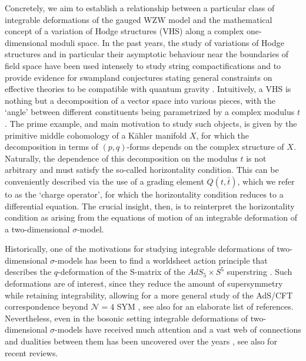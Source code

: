 \documentclass[11pt,a4paper]{article}
\numberwithin{equation}{section}
\numberwithin{table}{section}\setlength{\multlinegap}{25pt}
\begin{document}
Concretely, we aim to establish a relationship between a particular class of integrable deformations of the gauged WZW model and the mathematical concept of a variation of Hodge structures (VHS) along a complex one-dimensional moduli space. In the past years, the study of variations of Hodge structures and in particular their asymptotic behaviour near the boundaries of field space have been used intensely to study string compactifications and to provide evidence for swampland conjectures stating general constraints on effective theories to 
be compatible with quantum gravity \cite{GPV,Grimm:2018cpv,Palti:2019pca,Grimm:2019ixq,Grimm:2019wtx,Font:2019cxq,Gendler:2020dfp,Lanza:2020qmt,Calderon-Infante:2020dhm,Grimm:2020cda,Bastian:2020egp,Grimm:2020ouv,Bastian:2021hpc,Grimm:2021ckh,Palti:2021ubp}. Intuitively, a VHS is nothing but a decomposition of a vector space into various pieces, with the `angle' between different constituents being parametrized by a complex modulus $t$. The prime example, and main motivation to study such objects, is given by the primitive middle cohomology of a K\"ahler manifold $X$, for which the decomposition in terms of $(p,q)$-forms depends on the complex structure of $X$. Naturally, the dependence of this decomposition on the modulus $t$ is not arbitrary and must satisfy the so-called horizontality condition. This can be conveniently described via the use of a grading element $Q(t,\bar{t})$, which we refer to as the `charge operator', for which the horizontality condition reduces to a differential equation. The crucial insight, then, is to reinterpret the horizontality condition as arising from the equations of motion of an integrable deformation of a two-dimensional $\sigma$-model.


Historically, one of the motivations for studying integrable deformations of two-dimensional $\sigma$-models has been to find a worldsheet action principle that describes the $q$-deformation of the S-matrix of the $AdS_5\times S^5$ superstring \cite{Hoare:2011wr,Delduc:2013qra,Delduc:2014kha}. Such deformations are of interest, since they reduce the amount of supersymmetry while retaining integrability, allowing for a more general study of the AdS/CFT correspondence beyond $\mathcal{N}=4$ SYM \cite{Borsato:2013qpa,Hoare:2015kla,Pachol:2015mfa}, see also \cite{Beisert:2010jr} for an elaborate list of references. Nevertheless, even in the bosonic setting integrable deformations of two-dimensional $\sigma$-models have received much attention \cite{Klimcik:2002zj,Klimcik:2008eq,Delduc:2013fga,Kawaguchi:2013gma,Sfetsos:2014_integrability,Hollowood:2014,Hollowood:2014qma,Hoare:2014pna,Klimcik:2014bta,Delduc:2014uaa,Kawaguchi:2014qwa,vanTongeren:2015uha,Osten:2016dvf} and a vast web of connections and dualities between them has been uncovered over the years \cite{Klimcik_2015,Klimcik:2016rov,Hoare:2016wsk,Borsato:2016pas,Borsato:2017qsx}, see also \cite{Georgiou:2021pbd,Klimcik:2021bjy,Hoare:2021dix} for recent reviews.
\end{document}
